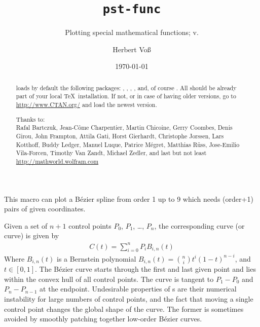 \documentclass[11pt,english,BCOR10mm,DIV12,bibliography=totoc,parskip=false,
   smallheadings, headexclude,footexclude,oneside]{pst-doc}
\let\pstFuncFV\fileversion
\begin{document}
\title{\texttt{pst-func}}
\subtitle{Plotting special mathematical functions; v.\pstFuncFV}
\author{Herbert Vo\ss}
\docauthor{}
\date{\today}
\maketitle

\tableofcontents
{}

\clearpage

\begin{abstract}
\noindent
{} loads by default the following packages: , 
, , , and, of course .
All should be already part of your local \TeX\ installation. If not, or in case
of having older versions, go to \url{http://www.CTAN.org/} and load the newest version.

\vfill\noindent
Thanks to: \\
Rafal Bartczuk,
    Jean-C\^ome Charpentier,
    Martin Chicoine, 
    Gerry Coombes, 
    Denis Girou,
    John Frampton, 
    Attila Gati, 
    Horst Gierhardt,  
    Christophe Jorssen,
    Lars Kotthoff, 
    Buddy Ledger,
    Manuel Luque,
    Patrice Mégret,
    Matthias Rüss,
    Jose-Emilio Vila-Forcen,
Timothy Van Zandt, 
Michael Zedler,
and last but not least \url{http://mathworld.wolfram.com}

\end{abstract}


\section{}
This macro can plot a B\'ezier spline from order 1 up to 9 which needs
(order+1) pairs of given coordinates.

Given a set of $n+1$ control points $P_0$, $P_1$, \ldots, $P_n$, the corresponding  curve 
(or  curve) is given by 
%
\begin{align}
C(t)=\sum_{i=0}^n P_i B_{i,n}(t)
\end{align}
%
Where $B_{i,n}(t)$ is a Bernstein polynomial $B_{i,n}(t)=\binom{n}{i}t^i(1-t)^{n-i}$, 
 and $t \in [0,1]$. 
The Bézier curve starts through the first and last given point and 
lies within the convex hull of all control points. The curve is tangent 
to $P_1-P_0$ and $P_n-P_{n-1}$ at the endpoint.
Undesirable properties of s are their numerical instability for 
large numbers of control points, and the fact that moving a single control 
point changes the global shape of the curve. The former is sometimes avoided 
by smoothly patching together low-order Bézier curves. 
\end{document}
